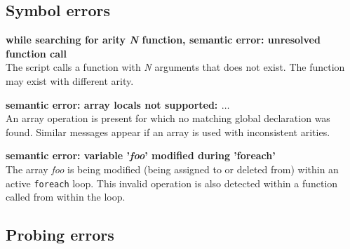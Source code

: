 \documentclass{article}
\begin{document}
\subsection{Symbol errors}

\begin{description}
\item{\bf while searching for arity {\em N} function, semantic error:
unresolved function call} \\ The script calls a function with {\em N}
arguments that does not exist.  The function may exist with different
arity.

\item{\bf semantic error: array locals not supported: $\ldots$} \\ An
array operation is present for which no matching global declaration
was found.  Similar messages appear if an array is used with
inconsistent arities.

\item{\bf semantic error: variable '{\em foo}' modified during 'foreach'} \\
The array {\em foo} is being modified (being assigned to or deleted from)
within an active \verb+foreach+ loop.  This invalid operation is also
detected within a function called from within the loop. 
\end{description}

\subsection{Probing errors }
\end{document}
